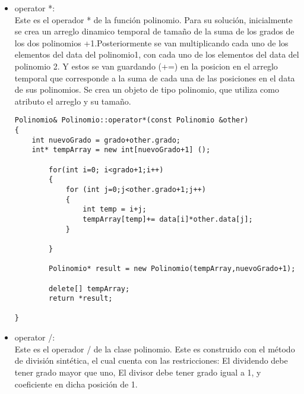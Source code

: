 \documentclass[11pt]{article}
\begin{document}
\begin{enumerate}
\begin{itemize}
\item operator *:\\
Este es el operador * de la funci\'on polinomio. Para su soluci\'on, inicialmente se crea un arreglo dinamico temporal de tama\~no de la suma de los grados de los dos polinomios +1.Posteriormente se van multiplicando cada uno de los elementos del data del polinomio1, con cada uno de los elementos del data del polinomio 2. Y estos se van guardando (+=) en la posicion en el arreglo temporal que corresponde a la suma de cada una de las posiciones en el data de sus polinomios.
Se crea un objeto de tipo polinomio, que utiliza como atributo el arreglo y su tama\~no.
\begin{lstlisting}
Polinomio& Polinomio::operator*(const Polinomio &other)
{   
    int nuevoGrado = grado+other.grado;
    int* tempArray = new int[nuevoGrado+1] ();
        
        for(int i=0; i<grado+1;i++)
        {
            for (int j=0;j<other.grado+1;j++)
            {
                int temp = i+j;
                tempArray[temp]+= data[i]*other.data[j];
            }
            
        }
        
        Polinomio* result = new Polinomio(tempArray,nuevoGrado+1);
        
        delete[] tempArray;
        return *result;
    
}

\end{lstlisting}

\item operator /:\\
Este es el operador / de la clase polinomio. Este es construido con el m\'etodo de divisi\'on sint\'etica, el cual cuenta con las restricciones: El dividendo debe tener grado mayor que uno, El divisor debe tener grado igual a 1, y coeficiente en dicha posici\'on de 1.


\end{itemize}
\end{enumerate}
\end{document}
